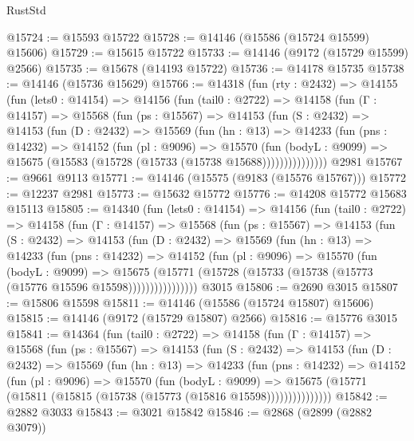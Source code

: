 \begin{lexlean}{RustStd}
\begin{coremodule}
@15724 := @15593 @15722
@15728 := @14146 (@15586 (@15724 @15599) @15606)
@15729 := @15615 @15722
@15733 := @14146 (@9172 (@15729 @15599) @2566)
@15735 := @15678 (@14193 @15722)
@15736 := @14178 @15735
@15738 := @14146 (@15736 @15629)
@15766 := @14318
    (fun (rty : @2432) =>
    @14155
      (fun (lets0 : @14154) =>
      @14156
        (fun (tail0 : @2722) =>
        @14158
          (fun (Γ : @14157) =>
          @15568
            (fun (ps : @15567) =>
            @14153
              (fun (S : @2432) =>
              @14153
                (fun (D : @2432) =>
                @15569
                  (fun (hn : @13) =>
                  @14233
                    (fun (pns : @14232) =>
                    @14152
                      (fun (pl : @9096) =>
                      @15570
                        (fun (bodyL : @9099) =>
                        @15675 (@15583 (@15728 (@15733 (@15738 @15688)))))))))))))))
    @2981
@15767 := @9661 @9113
@15771 := @14146 (@15575 (@9183 (@15576 @15767)))
@15772 := @12237 @2981
@15773 := @15632 @15772
@15776 := @14208 @15772 @15683 @15113
@15805 := @14340
    (fun (lets0 : @14154) =>
    @14156
      (fun (tail0 : @2722) =>
      @14158
        (fun (Γ : @14157) =>
        @15568
          (fun (ps : @15567) =>
          @14153
            (fun (S : @2432) =>
            @14153
              (fun (D : @2432) =>
              @15569
                (fun (hn : @13) =>
                @14233
                  (fun (pns : @14232) =>
                  @14152
                    (fun (pl : @9096) =>
                    @15570
                      (fun (bodyL : @9099) =>
                      @15675
                        (@15771
                          (@15728 (@15733 (@15738 (@15773 (@15776 @15596 @15598))))))))))))))))
    @3015
@15806 := @2690 @3015
@15807 := @15806 @15598
@15811 := @14146 (@15586 (@15724 @15807) @15606)
@15815 := @14146 (@9172 (@15729 @15807) @2566)
@15816 := @15776 @3015
@15841 := @14364
    (fun (tail0 : @2722) =>
    @14158
      (fun (Γ : @14157) =>
      @15568
        (fun (ps : @15567) =>
        @14153
          (fun (S : @2432) =>
          @14153
            (fun (D : @2432) =>
            @15569
              (fun (hn : @13) =>
              @14233
                (fun (pns : @14232) =>
                @14152
                  (fun (pl : @9096) =>
                  @15570
                    (fun (bodyL : @9099) =>
                    @15675 (@15771 (@15811 (@15815 (@15738 (@15773 (@15816 @15598)))))))))))))))
@15842 := @2882 @3033
@15843 := @3021 @15842
@15846 := @2868 (@2899 (@2882 @3079))

\end{coremodule}
\end{lexlean}
